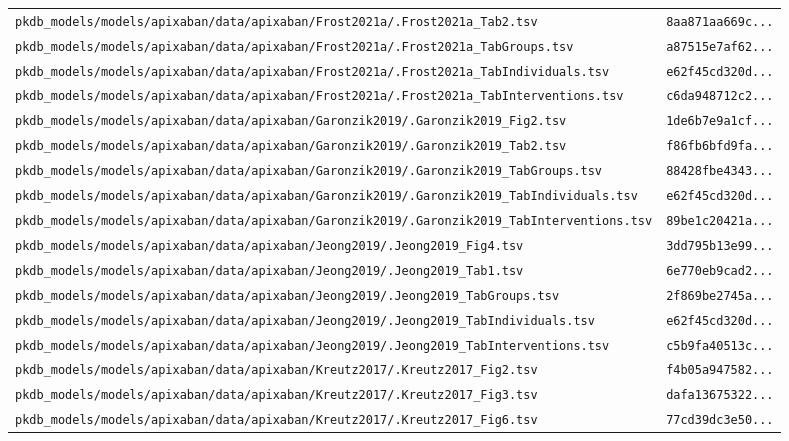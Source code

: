 \begin{longtable}{ll}
\texttt{pkdb\_models/models/apixaban/data/apixaban/Frost2021a/.Frost2021a\_Tab2.tsv} & \texttt{8aa871aa669c...} \\
\texttt{pkdb\_models/models/apixaban/data/apixaban/Frost2021a/.Frost2021a\_TabGroups.tsv} & \texttt{a87515e7af62...} \\
\texttt{pkdb\_models/models/apixaban/data/apixaban/Frost2021a/.Frost2021a\_TabIndividuals.tsv} & \texttt{e62f45cd320d...} \\
\texttt{pkdb\_models/models/apixaban/data/apixaban/Frost2021a/.Frost2021a\_TabInterventions.tsv} & \texttt{c6da948712c2...} \\
\texttt{pkdb\_models/models/apixaban/data/apixaban/Garonzik2019/.Garonzik2019\_Fig2.tsv} & \texttt{1de6b7e9a1cf...} \\
\texttt{pkdb\_models/models/apixaban/data/apixaban/Garonzik2019/.Garonzik2019\_Tab2.tsv} & \texttt{f86fb6bfd9fa...} \\
\texttt{pkdb\_models/models/apixaban/data/apixaban/Garonzik2019/.Garonzik2019\_TabGroups.tsv} & \texttt{88428fbe4343...} \\
\texttt{pkdb\_models/models/apixaban/data/apixaban/Garonzik2019/.Garonzik2019\_TabIndividuals.tsv} & \texttt{e62f45cd320d...} \\
\texttt{pkdb\_models/models/apixaban/data/apixaban/Garonzik2019/.Garonzik2019\_TabInterventions.tsv} & \texttt{89be1c20421a...} \\
\texttt{pkdb\_models/models/apixaban/data/apixaban/Jeong2019/.Jeong2019\_Fig4.tsv} & \texttt{3dd795b13e99...} \\
\texttt{pkdb\_models/models/apixaban/data/apixaban/Jeong2019/.Jeong2019\_Tab1.tsv} & \texttt{6e770eb9cad2...} \\
\texttt{pkdb\_models/models/apixaban/data/apixaban/Jeong2019/.Jeong2019\_TabGroups.tsv} & \texttt{2f869be2745a...} \\
\texttt{pkdb\_models/models/apixaban/data/apixaban/Jeong2019/.Jeong2019\_TabIndividuals.tsv} & \texttt{e62f45cd320d...} \\
\texttt{pkdb\_models/models/apixaban/data/apixaban/Jeong2019/.Jeong2019\_TabInterventions.tsv} & \texttt{c5b9fa40513c...} \\
\texttt{pkdb\_models/models/apixaban/data/apixaban/Kreutz2017/.Kreutz2017\_Fig2.tsv} & \texttt{f4b05a947582...} \\
\texttt{pkdb\_models/models/apixaban/data/apixaban/Kreutz2017/.Kreutz2017\_Fig3.tsv} & \texttt{dafa13675322...} \\
\texttt{pkdb\_models/models/apixaban/data/apixaban/Kreutz2017/.Kreutz2017\_Fig6.tsv} & \texttt{77cd39dc3e50...} \\

\end{longtable}
